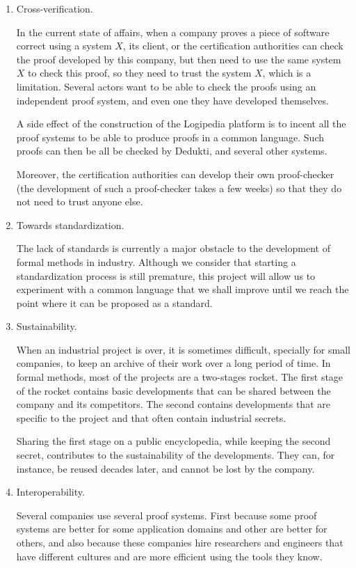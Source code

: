 \begin{enumerate}
\item Cross-verification.

In the current state of affairs, when a company proves a piece of
software correct using a system $X$, its client, or the certification
authorities can check the proof developed by this company, but then
need to use the same system $X$ to check this proof, so they need to
trust the system $X$, which is a limitation. Several actors want to be
able to check the proofs using an independent proof system, and even
one they have developed themselves.

A side effect of the construction of the Logipedia platform is
to incent all the proof systems to be able to produce proofs in a
common language. Such proofs can then be all be checked by
Dedukti, and several other systems.

Moreover, the certification authorities can develop their own
proof-checker (the development of such a proof-checker takes a few
weeks) so that they do not need to trust anyone else.

\item Towards standardization.

The lack of standards is currently a major obstacle to the development
of formal methods in industry. Although we consider that starting a
standardization process is still premature, this project will allow us
to experiment with a common language that we shall improve until we
reach the point where it can be proposed as a standard.

\item Sustainability.

When an industrial project is over, it is sometimes difficult,
specially for small companies, to keep an archive of their work over
a long period of time. In formal methods, most of the projects are a
two-stages rocket. The first stage of the rocket contains basic
developments that can be shared between the company and its
competitors. The second contains developments that are specific to the
project and that often contain industrial secrets.

Sharing the first stage on a public encyclopedia, while keeping the
second secret, contributes to the sustainability of the
developments. They can, for instance, be reused decades later, and
cannot be lost by the company.

\item Interoperability.

Several companies use several proof systems. First because some proof
systems are better for some application domains and other are better
for others, and also because these companies hire researchers and
engineers that have different cultures and are more efficient using the
tools they know.


\end{enumerate}
